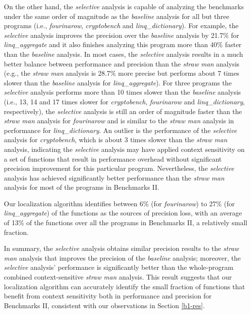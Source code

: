 On the other hand, the {\it selective} analysis is capable of analyzing the benchmarks under the same order of magnitude as the {\it baseline} analysis for all but three programs (i.e., {\it fourinarow}, {\it cryptobench} and {\it linq\_dictionary}). For example, the {\it selective} analysis improves the precision over the {\it baseline} analysis by 21.7\% for {\it linq\_aggregate} and it also finishes analyzing this program more than 40\% faster than the {\it baseline} analysis. In most cases, the {\it selective} analysis results in a much better balance between performance and precision than the {\it straw man} analysis (e.g., the {\it straw man} analysis is 28.7\% more precise but performs about 7 times slower than the {\it baseline} analysis for {\it linq\_aggregate}). For three programs the {\it selective} analysis performs more than 10 times slower than the {\it baseline} analysis (i.e., 13, 14 and 17 times slower for {\it cryptobench}, {\it fourinarow} and {\it linq\_dictionary}, respectively), the {\it selective} analysis is still an order of magnitude faster than the {\it straw man} analysis for {\it fourinarow} and is similar to the {\it straw man} analysis in performance for {\it linq\_dictionary}. An outlier is the performance of the {\it selective} analysis for {\it cryptobench}, which is about 3 times slower than the {\it straw man} analysis, indicating the {\it selective} analysis may have applied context sensitivity on a set of functions that result in performance overhead without significant precision improvement for this particular program. Nevertheless, the {\it selective} analysis has achieved significantly better performance than the {\it straw man} analysis for most of the programs in Benchmarks II.

Our localization algorithm identifies between 6\% (for {\it fourinarow}) to 27\% (for {\it linq\_aggregate}) of the functions as the sources of precision loss, with an average of 13\% of the functions over all the programs in Benchmarks II, a relatively small fraction.

In summary, the {\it selective} analysis obtains similar precision results to the {\it straw man} analysis that improves the precision of the {\it baseline} analysis; moreover, the {\it selective} analysis' performance is significantly better than the whole-program combined context-sensitive {\it straw man} analysis. This result suggests that our localization algorithm can accurately identify the small fraction of functions that benefit from context sensitivity both in performance and precision for Benchmarks II, consistent with our observations in Section \ref{b1-res}.

